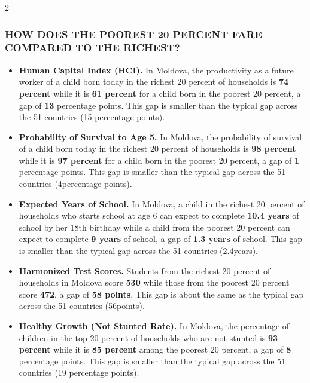 \documentclass[8pt,]{article}
\begin{document}
\begin {multicols}{2}

\hypertarget{section}{%
\subsubsection{\texorpdfstring{\textcolor{bondiblue}{\textbf{H\small{OW DOES THE POOREST 20 PERCENT FARE COMPARED TO THE RICHEST?}}}}{}}\label{section}}

\begin{itemize}
\item
  \textbf{Human Capital Index (HCI).} In Moldova, the productivity as a
  future worker of a child born today in the richest 20 percent of
  households is \textbf{74 percent} while it is \textbf{61 percent} for
  a child born in the poorest 20 percent, a gap of \textbf{13}
  percentage points. This gap is smaller than the typical gap across the
  51 countries (15 percentage points).
\item
  \textbf{Probability of Survival to Age 5.} In Moldova, the probability
  of survival of a child born today in the richest 20 percent of
  households is \textbf{98 percent} while it is \textbf{97 percent} for
  a child born in the poorest 20 percent, a gap of \textbf{1} percentage
  points. This gap is smaller than the typical gap across the 51
  countries (4percentage points).
\item
  \textbf{Expected Years of School.} In Moldova, a child in the richest
  20 percent of households who starts school at age 6 can expect to
  complete \textbf{10.4 years} of school by her 18th birthday while a
  child from the poorest 20 percent can expect to complete \textbf{9
  years} of school, a gap of \textbf{1.3 years} of school. This gap is
  smaller than the typical gap across the 51 countries (2.4years).
\item
  \textbf{Harmonized Test Scores.} Students from the richest 20 percent
  of households in Moldova score \textbf{530} while those from the
  poorest 20 percent score \textbf{472}, a gap of \textbf{58 points}.
  This gap is about the same as the typical gap across the 51 countries
  (56points).
\item
  \textbf{Healthy Growth (Not Stunted Rate).} In Moldova, the percentage
  of children in the top 20 percent of households who are not stunted is
  \textbf{93 percent} while it is \textbf{85 percent} among the poorest
  20 percent, a gap of \textbf{8} percentage points. This gap is smaller
  than the typical gap across the 51 countries (19 percentage points).
\end{itemize}


\end{multicols}
\end{document}

